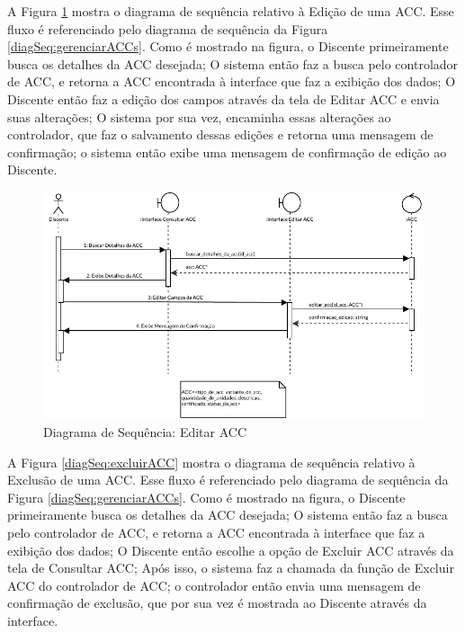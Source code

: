 A Figura \ref{diagSeq:editarACC} mostra o diagrama de sequência relativo à Edição de uma ACC. Esse fluxo é referenciado pelo diagrama de sequência da Figura \ref{diagSeq:gerenciarACCs}. Como é mostrado na figura, o Discente primeiramente busca os detalhes da ACC desejada; O sistema então faz a busca pelo controlador de ACC, e retorna a ACC encontrada à interface que faz a exibição dos dados; O Discente então faz a edição dos campos através da tela de Editar ACC e envia suas alterações; O sistema por sua vez, encaminha essas alterações ao controlador, que faz o salvamento dessas edições e retorna uma mensagem de confirmação; o sistema então exibe uma mensagem de confirmação de edição ao Discente.

\begin{figure}[H]
    \centering 
    \includegraphics[width=\textwidth]{dados/figuras/Proposta/DiagramasDeSequencia/Gerenciar ACCs_ Completo-Editar ACC.pdf}
    \caption{Diagrama de Sequência: Editar ACC}
    \label{diagSeq:editarACC}
\end{figure}

A Figura \ref{diagSeq:excluirACC} mostra o diagrama de sequência relativo à Exclusão de uma ACC. Esse fluxo é referenciado pelo diagrama de sequência da Figura \ref{diagSeq:gerenciarACCs}. Como é mostrado na figura, o Discente primeiramente busca os detalhes da ACC desejada; O sistema então faz a busca pelo controlador de ACC, e retorna a ACC encontrada à interface que faz a exibição dos dados; O Discente então escolhe a opção de Excluir ACC através da tela de Consultar ACC; Após isso, o sistema faz a chamada da função de Excluir ACC do controlador de ACC; o controlador então envia uma mensagem de confirmação de exclusão, que por sua vez é mostrada ao Discente através da interface.

